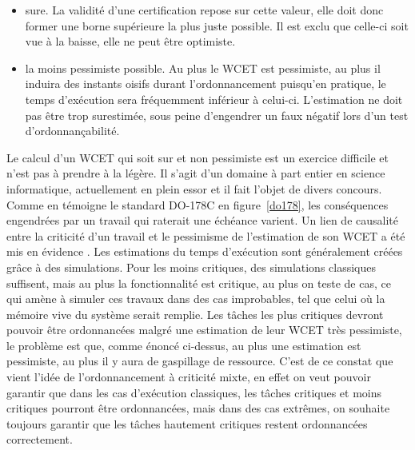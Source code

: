 \documentclass[a4paper]{report}
\theoremstyle{break}
\begin{document}
\begin{itemize}
\item sure. La validité d'une certification repose sur cette valeur, elle doit donc former une borne supérieure la plus juste possible. Il est exclu que celle-ci soit vue à la baisse, elle ne peut être optimiste.
\item la moins pessimiste possible. Au plus le WCET est pessimiste, au plus il induira des instants oisifs durant l'ordonnancement puisqu'en pratique, le temps d'exécution sera fréquemment inférieur à celui-ci. L'estimation ne doit pas être trop surestimée, sous peine d'engendrer un faux négatif lors d'un test d'ordonnançabilité.
\end{itemize}
Le calcul d'un WCET qui soit sur et non pessimiste est un exercice difficile et n'est pas à prendre à la légère. Il s'agit d'un domaine à part entier en science informatique, actuellement en plein essor et il fait l'objet de divers concours.\\

Comme en témoigne le standard DO-178C en figure~\ref{do178}, les conséquences engendrées par un travail qui raterait une échéance varient. Un lien de causalité entre la criticité d'un travail et le pessimisme de l'estimation de son WCET a été mis en évidence \cite{vestal2007preemptive}. Les estimations du temps d'exécution sont généralement créées grâce à des simulations. Pour les moins critiques, des simulations classiques suffisent, mais au plus la fonctionnalité est critique, au plus on teste de cas, ce qui amène à simuler ces travaux dans des cas improbables, tel que celui où la mémoire vive du système serait remplie. Les tâches les plus critiques devront pouvoir être ordonnancées malgré une estimation de leur WCET très pessimiste, le problème est que, comme énoncé ci-dessus, au plus une estimation est pessimiste, au plus il y aura de gaspillage de ressource. C'est de ce constat que vient l'idée de l'ordonnancement à criticité mixte, en effet on veut pouvoir garantir que dans les cas d'exécution classiques, les tâches critiques et moins critiques pourront être ordonnancées, mais dans des cas extrêmes, on souhaite toujours garantir que les tâches hautement critiques restent ordonnancées correctement.\\
\end{document}
